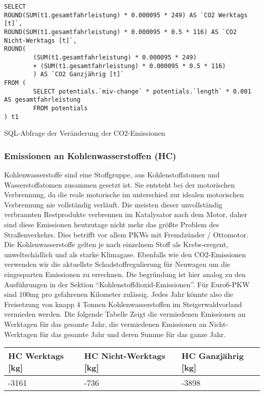 \documentclass[fontsize=12pt,a4paper]{scrreprt}
\begin{document}
\begin{listing}[htbp]
\begin{verbatim}
SELECT 
ROUND(SUM(t1.gesamtfahrleistung) * 0.000095 * 249) AS `CO2 Werktags [t]`, 
ROUND(SUM(t1.gesamtfahrleistung) * 0.000095 * 0.5 * 116) AS `CO2 Nicht-Werktags [t]`, 
ROUND(
        (SUM(t1.gesamtfahrleistung) * 0.000095 * 249) 
        + (SUM(t1.gesamtfahrleistung) * 0.000095 * 0.5 * 116)
        ) AS `CO2 Ganzjährig [t]`
FROM (
        SELECT potentials.`miv-change` * potentials.`length` * 0.001 AS gesamtfahrleistung
        FROM potentials
) t1
\end{verbatim}
\caption{SQL-Abfrage der Veränderung der CO2-Emissionen}\label{lst-emmissionen-co2}
\end{listing}

\subsubsection{Emissionen an Kohlenwasserstoffen (HC)}
Kohlenwasserstoffe sind eine Stoffgruppe, aus Kohlenstoffatomen und Wasserstoffatomen zusammen gesetzt ist. Sie entsteht bei der motorischen Verbrennung, da die reale motorische im unterschied zur idealen motorischen Verbrennung nie vollständig verläuft. Die meisten dieser unvollständig verbrannten Restprodukte verbrennen im Katalysator nach dem Motor, daher sind diese Emissionen heutzutage nicht mehr das größte Problem des Straßenverkehrs. Dies betrifft vor allem PKWs mit Fremdzünder / Ottomotor. Die Kohlenwasserstoffe gelten je nach einzelnem Stoff als Krebs-eregent, unweltschädlich und als starke Klimagase. 
\newline
\newline
Ebenfalls wie den CO2-Emissionen verwenden wir die aktuellste Schadstoffregulierung für Neuwagen um die eingesparten Emissionen zu errechnen. Die begründung ist hier analog zu den Ausführungen in der Sektion \enquote{Kohlenstoffdioxid-Emissionen}.
\newline
\newline
Für Euro6-PKW sind 100mg pro gefahrenen Kilometer zulässig. 
\newline
\newline
Jedes Jahr könnte also die Freisetzung von knapp 4 Tonnen Kohlenwasserstoffen im Steigerwaldvorland vermieden werden.
\newline
\newline
Die folgende Tabelle Zeigt die vermiedenen Emissionen an Werktagen für das gesamte Jahr, die vermiedenen Emissionen an Nicht-Werktagen für das gesamte Jahr und deren Summe für das ganze Jahr.
\newline
\newline
\begin{tabular}{|l|l|l|}
\hline
HC Werktags [kg] & HC Nicht-Werktags [kg] & HC Ganzjährig [kg]\\ 
\hline
-3161 & -736 & -3898\\ 
\hline
\end{tabular}
\end{document}
